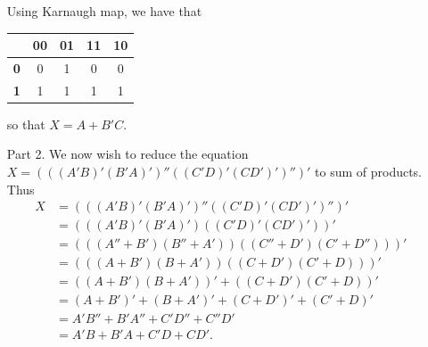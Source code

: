 \documentclass[9pt]{article}
\begin{document}
\begin{enumerate}
            Using Karnaugh map, we have that
            \begin{center}
            \begin{tabular}{@{}|c|c|c|c|c|@{}}
            \hline
            & \textbf{00} & \textbf{01} & \textbf{11} & \textbf{10} \\ \hline
            \textbf{0} & 0 & 1 & 0 & 0 \\ \hline
            \textbf{1} & 1 & 1 & 1 & 1 \\
            \hline
\end{tabular}
            \end{center}
            
            so that $X = A + B'C$.
   \item[Part 2.] We now wish to reduce the equation
                 $X = (((A'B)'(B'A)')'' ((C'D)'(CD')')'')'$ to sum of
             products. Thus
             \begin{align*}
               X &= (((A'B)'(B'A)')'' ((C'D)'(CD')')'')' \\
                 &= (((A'B)'(B'A)') ((C'D)'(CD')'))' \\
                 &= (((A'' + B')(B'' + A')) ((C'' + D')(C' + D'')))' \\
                 &= (((A + B')(B + A')) ((C + D')(C' + D)))' \\
                 &= ((A + B')(B + A'))' + ((C + D')(C' + D))' \\
                 &= (A + B')' + (B + A')' + (C + D')' + (C' + D)' \\
                 &= A'B'' + B'A'' + C'D'' + C''D' \\
                 &= A'B + B'A + C'D + CD'.
             \end{align*}             
             

\end{enumerate}
\end{document}
